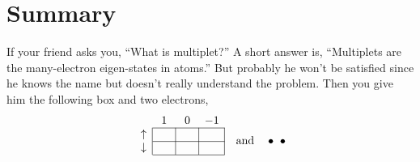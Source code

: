 \chapter{Summary}

If your friend asks you, ``What is multiplet?'' A short answer is,
``Multiplets are the many-electron eigen-states in atoms.'' But probably
he won't be satisfied since he knows the name but doesn't really understand
the problem. Then you give him the following box and two electrons,
\begin{equation*}
\begin{array}{c|c|c|c|}
\multicolumn{1}{c}{} & \multicolumn{1}{c}{\phantom{,}1\phantom{,}} & \multicolumn{1}{c}{\phantom{,}0\phantom{,}} & \multicolumn{1}{c}{-1} \\ \cline{2-4}
\uparrow &  &  &  \\ \cline{2-4}
\downarrow &  &  &  \\
\cline{2-4}
\multicolumn{1}{c}{}
\end{array}
\quad \text{and} \quad
\bullet \ \bullet
\end{equation*}

